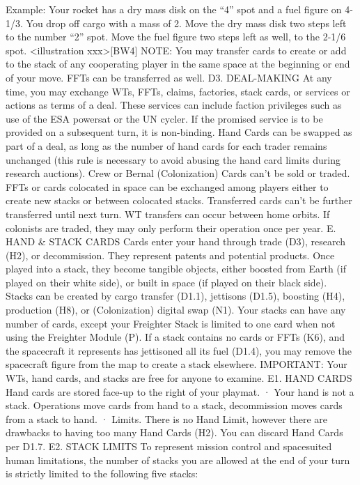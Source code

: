 \documentclass[a4paper]{book}
\begin{document}
Example: Your rocket has a dry mass disk on the “4” spot and a fuel figure on 4-1/3. You drop off cargo with a mass of 2. Move the dry mass disk two steps left to the number “2” spot. Move the fuel figure two steps left as well, to the 2-1/6 spot. <illustration xxx>[BW4] 
NOTE: You may transfer cards to create or add to the stack of any cooperating player in the same space at the beginning or end of your move. FFTs can be transferred as well.
D3. DEAL-MAKING
At any time, you may exchange WTs, FFTs, claims, factories, stack cards, or services or actions as terms of a deal. These services can include faction privileges such as use of the ESA powersat or the UN cycler. If the promised service is to be provided on a subsequent turn, it is non-binding. Hand Cards can be swapped as part of a deal, as long as the number of hand cards for each trader remains unchanged (this rule is necessary to avoid abusing the hand card limits during research auctions). Crew or Bernal (Colonization) Cards can’t be sold or traded.
FFTs or cards colocated in space can be exchanged among players either to create new stacks or between colocated stacks. Transferred cards can’t be further transferred until next turn. WT transfers can occur between home orbits.
If colonists are traded, they may only perform their operation once per year.
E. HAND \& STACK CARDS
Cards enter your hand through trade (D3), research (H2), or decommission. They represent patents and potential products. Once played into a stack, they become tangible objects, either boosted from Earth (if played on their white side), or built in space (if played on their black side).
Stacks can be created by cargo transfer (D1.1), jettisons (D1.5), boosting (H4), production (H8), or (Colonization) digital swap (N1).
Your stacks can have any number of cards, except your Freighter Stack is limited to one card when not using the Freighter Module (P).
If a stack contains no cards or FFTs (K6), and the spacecraft it represents has jettisoned all its fuel (D1.4), you may remove the spacecraft figure from the map to create a stack elsewhere. IMPORTANT: Your WTs, hand cards, and stacks are free for anyone to examine.
E1. HAND CARDS
Hand cards are stored face-up to the right of your playmat.
·       Your hand is not a stack. Operations move cards from hand to a stack, decommission moves cards from a stack to hand.
·       Limits. There is no Hand Limit, however there are drawbacks to having too many Hand Cards (H2). You can discard Hand Cards per D1.7.
E2. STACK LIMITS
To represent mission control and spacesuited human limitations, the number of stacks you are allowed at the end of your turn is strictly limited to the following five stacks:
\end{document}
